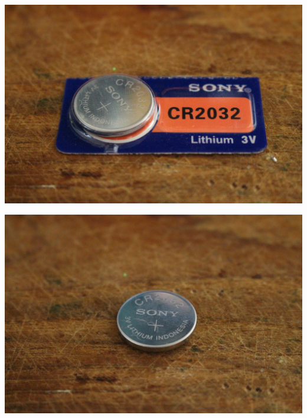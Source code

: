 \documentclass{article}
\begin{document}
\vspace{1cm}

\begin{minipage}[b]{0.5\textwidth}
	\includegraphics[width=\textwidth]{Bilder2022/IMG_8243.JPG}
\end{minipage}
\begin{minipage}[b]{0.5\textwidth}
	\includegraphics[width=\textwidth]{Bilder2022/IMG_8245.JPG}
\end{minipage}

\vspace{0.5cm}
\end{document}
